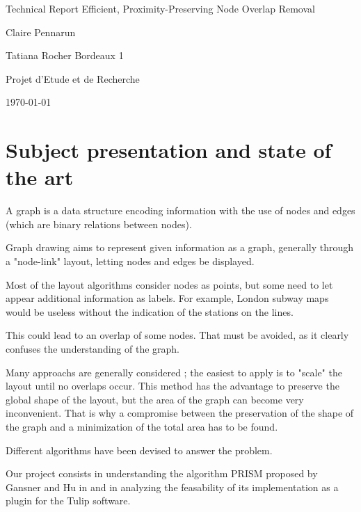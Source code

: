 \documentclass[12pt]{report}
\begin{document}
\begin{titlepage}
\begin{center}

\hfill

\bigskip
\huge{Technical Report} 
\vfill
\bigskip 
\Huge 
\bigskip Efficient, Proximity-Preserving Node Overlap Removal \par 
\vfill
\Large Claire Pennarun \par 
		Tatiana Rocher
\vfill
\Large Bordeaux 1 \par \Large Projet d'Etude et de Recherche		
		\bigskip 
\bigskip

\Large
\today
\end{center}
\end{titlepage}

\tableofcontents
\newpage

\chapter{Subject presentation and state of the art}

A graph is a data structure encoding information with the use of nodes and edges (which are binary relations between nodes).

Graph drawing aims to represent given information as a graph, generally through a "node-link" layout, letting nodes and edges be displayed. 

\bigskip
Most of the layout algorithms consider nodes as points, but some need to let appear additional information as labels. For example, London subway maps would be useless without the indication of the stations on the lines.

This could lead to an overlap of some nodes. That must be avoided, as it clearly confuses the understanding of the graph.

Many approachs are generally considered ; the easiest to apply is to "scale" the layout until no overlaps occur. This method has the advantage to preserve the global shape of the layout, but the area of the graph can become very inconvenient. That is why a compromise between the preservation of the shape of the graph and a minimization of the total area has to be found.

Different algorithms have been devised to answer the problem. 

\bigskip
Our project consists in understanding the algorithm PRISM proposed by Gansner and Hu in \cite{GH08} and in analyzing the feasability of its implementation as a plugin for the Tulip software. %
\end{document}
